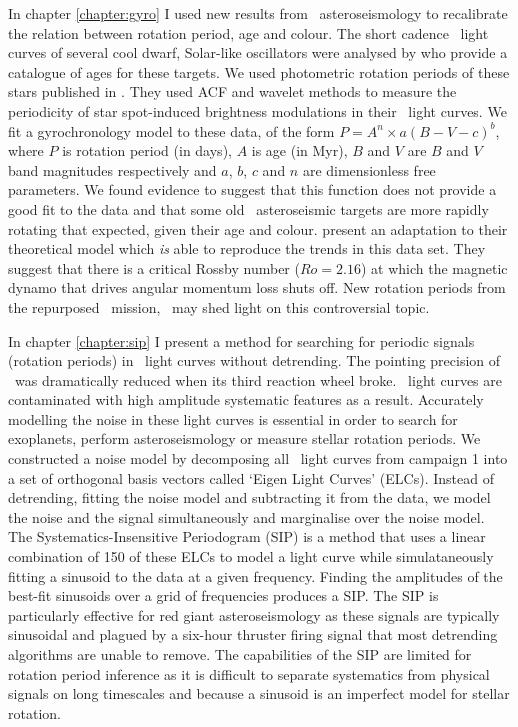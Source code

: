 \label{chapter:conclusions}

In chapter \ref{chapter:gyro} I used new results from \kepler\
asteroseismology to recalibrate the relation between rotation period, age and
colour.
The short cadence \kepler\ light curves of several cool dwarf, Solar-like
oscillators were analysed by \citet{Chaplin2014} who provide a catalogue of
ages for these targets.
We used photometric rotation periods of these stars published in
\citet{Garcia2014}.
They used ACF and wavelet methods to measure the periodicity of star
spot-induced brightness modulations in their \kepler\ light curves.
We fit a gyrochronology model to these data, of the form $P = A^n \times
a(B-V-c)^b$, where $P$ is rotation period (in days), $A$ is age (in Myr), $B$
and $V$ are $B$ and $V$ band magnitudes respectively and $a$, $b$, $c$ and $n$ are
dimensionless free parameters.
We found evidence to suggest that this function does not provide a good fit to
the data and that some old \kepler\ asteroseismic targets are more rapidly
rotating that expected, given their age and colour.
\citet{Vansaders2016} present an adaptation to their theoretical model which
{\it is} able to reproduce the trends in this data set.
They suggest that there is a critical Rossby number ($Ro=2.16$) at which the
magnetic dynamo that drives angular momentum loss shuts off.
New rotation periods from the repurposed \kepler\ mission, \ktwo\ may shed
light on this controversial topic.

In chapter \ref{chapter:sip} I present a method for searching for periodic
signals (\eg rotation periods) in \ktwo\ light curves without detrending.
The pointing precision of \kepler\ was dramatically reduced when its third
reaction wheel broke.
\ktwo\ light curves are contaminated with high amplitude systematic features
as a result.
Accurately modelling the noise in these light curves is essential in order to
search for exoplanets, perform asteroseismology or measure stellar rotation
periods.
We constructed a noise model by decomposing all \ktwo\ light curves from
campaign 1 into a set of orthogonal basis vectors called `Eigen Light Curves'
(ELCs).
Instead of detrending, fitting the noise model and subtracting it from the
data, we model the noise and the signal simultaneously and marginalise over
the noise model.
The Systematics-Insensitive Periodogram (SIP) is a method that uses a linear
combination of 150 of these ELCs to model a light curve while simulataneously
fitting a sinusoid to the data at a given frequency.
Finding the amplitudes of the best-fit sinusoids over a grid of frequencies
produces a SIP.
The SIP is particularly effective for red giant asteroseismology as these
signals are typically sinusoidal and plagued by a six-hour thruster firing
signal that most detrending algorithms are unable to remove.
The capabilities of the SIP are limited for rotation period inference as
it is difficult to separate systematics from physical signals on long
timescales and because a sinusoid is an imperfect model for stellar rotation.

